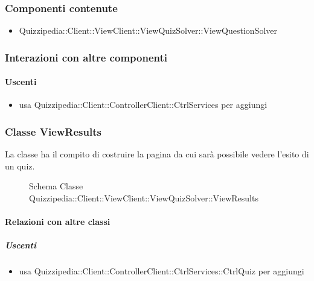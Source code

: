 \subsubsection{Componenti contenute}
\begin{itemize}
\item Quizzipedia::Client::ViewClient::ViewQuizSolver::ViewQuestionSolver
\end{itemize}
\subsubsection{Interazioni con altre componenti}
\paragraph{Uscenti}
\begin{itemize}
\item usa Quizzipedia::Client::ControllerClient::CtrlServices per aggiungi
\end{itemize}
\subsubsection{Classe ViewResults}
La classe ha il compito di costruire la pagina da cui sarà possibile vedere l'esito di un quiz.
\begin{figure}[H]
\centering
\noindent{}
\caption[Schema Classe ViewResults]{Schema Classe Quizzipedia::Client::ViewClient::ViewQuizSolver::ViewResults}
\end{figure}
\paragraph{Relazioni con altre classi}
\subparagraph{Uscenti}
\begin{itemize}
\item usa Quizzipedia::Client::ControllerClient::CtrlServices::CtrlQuiz per aggiungi
\end{itemize}
